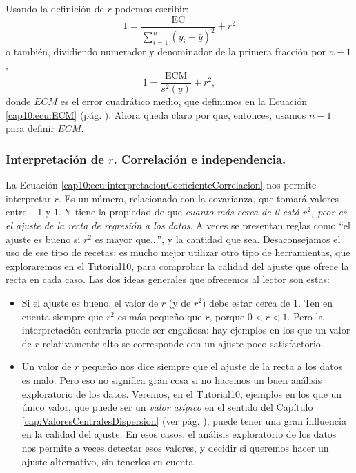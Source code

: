 Usando la definición de $r$ podemos escribir:
\[1 =\dfrac{\mbox{EC}}{\displaystyle\sum_{i=1}^{n}(y_i-\bar y)^2}+r^2\]
o también, dividiendo numerador y denominador de la primera fracción por $n-1$,
\begin{equation}\label{cap10:ecu:interpretacionCoeficienteCorrelacion}
1 =\dfrac{\mbox{ECM}}{s^2(y)}+r^2,
\end{equation}
donde $ECM$ es el error cuadrático medio, que definimos en la Ecuación \ref{cap10:ecu:ECM} (pág.
\pageref{cap10:ecu:ECM}). Ahora queda claro por que, entonces, usamos $n-1$ para definir $ECM$.

\subsubsection{Interpretación de $r$. Correlación e independencia.}

La Ecuación \ref{cap10:ecu:interpretacionCoeficienteCorrelacion} nos permite interpretar $r$. Es un número, relacionado con la covarianza, que tomará valores entre $-1$ y $1$. Y tiene la propiedad de que {\em cuanto más cerca de 0 está $r^2$, peor es el ajuste de la recta de regresión a los
datos}.  A veces se presentan reglas como ``el ajuste es bueno si $r^2$ es mayor que...'', y la cantidad que sea. Desaconsejamos el uso de ese tipo de recetas: es mucho mejor utilizar otro tipo de herramientas, que exploraremos en el Tutorial10, para comprobar la calidad del ajuste que ofrece la recta en cada caso. Las dos ideas generales que ofrecemos al lector son estas:
\begin{itemize}
  \item Si el ajuste es bueno, el valor de $r$ (y de $r^2$) debe estar cerca de $1$. Ten en cuenta siempre que $r^2$ es más pequeño que $r$, porque $0<r<1$. Pero la interpretación contraria puede ser engañosa: hay ejemplos en los que un valor de $r$ relativamente alto se corresponde con un ajuste poco satisfactorio.
  \item Un valor de $r$ pequeño nos dice siempre que el ajuste de la recta a los datos es malo. Pero eso no significa gran cosa si no hacemos un buen análisis exploratorio de los datos. Veremos, en el Tutorial10, ejemplos en los que un único valor, que puede ser un {\em valor atípico} en el sentido del Capítulo \ref{cap:ValoresCentralesDispersion} (ver pág. \pageref{cap02:subsubsec:RangoIntercuartilico}), puede tener una gran influencia en la calidad del ajuste. En esos casos, el análisis exploratorio de los datos nos permite a veces detectar esos valores, y decidir si queremos hacer un ajuste alternativo, sin tenerlos en cuenta.
\end{itemize}

